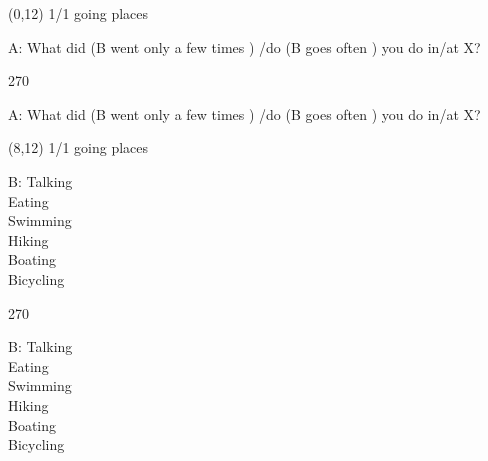 \documentclass[a4paper]{article}
\newcommand{\mycard}[3]{%
	\small #1 #2
	\par
	\parbox[t][6.8cm][c]{9.5cm}{%
	\par
	\myleft{#3}
	\par
	\myright{#3}
	}
}
\newcommand{\myleft}[1]{%
	\begin{sideways}
	\hspace*{-0.3cm}
		\parbox[t][2.7cm][t]{6.5cm}{%
		\Large #1
		}
	\end{sideways}
}
\newcommand{\myright}[1]{%
	\hspace*{6.5cm}
	\begin{turn}{270}
	\hspace*{-6.9cm}
		\parbox[t][2.7cm][t]{6.5cm}{%
		\Large #1
		}
	\end{turn}
}
\begin{document}
\begin{textblock}{8}(0,12)
\mycard{1/1}{going places}{
A: What did (\normalsize B went only a few times \Large) /do (\normalsize B goes often \Large) you do in/at X?\\
}
\end{textblock}

\begin{textblock}{8}(8,12)
\mycard{1/1}{going places}{
B: Talking\\
Eating\\
Swimming\\
Hiking\\
Boating\\
Bicycling\\
}
\end{textblock}

\null
\newpage
\end{document}
